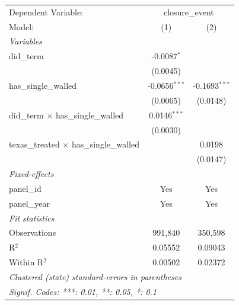 
\begingroup
\centering
\begin{tabular}{lcc}
   \tabularnewline \midrule \midrule
   Dependent Variable: & \multicolumn{2}{c}{closure\_event}\\
   Model:                                          & (1)             & (2)\\  
   \midrule
   \emph{Variables}\\
   did\_term                                       & -0.0087$^{*}$   &   \\   
                                                   & (0.0045)        &   \\   
   has\_single\_walled                             & -0.0656$^{***}$ & -0.1693$^{***}$\\   
                                                   & (0.0065)        & (0.0148)\\   
   did\_term $\times$ has\_single\_walled          & 0.0146$^{***}$  &   \\   
                                                   & (0.0030)        &   \\   
   texas\_treated $\times$ has\_single\_walled     &                 & 0.0198\\   
                                                   &                 & (0.0147)\\   
   \midrule
   \emph{Fixed-effects}\\
   panel\_id                                       & Yes             & Yes\\  
   panel\_year                                     & Yes             & Yes\\  
   \midrule
   \emph{Fit statistics}\\
   Observations                                    & 991,840         & 350,598\\  
   R$^2$                                           & 0.05552         & 0.09043\\  
   Within R$^2$                                    & 0.00502         & 0.02372\\  
   \midrule \midrule
   \multicolumn{3}{l}{\emph{Clustered (state) standard-errors in parentheses}}\\
   \multicolumn{3}{l}{\emph{Signif. Codes: ***: 0.01, **: 0.05, *: 0.1}}\\
\end{tabular}
\par\endgroup


